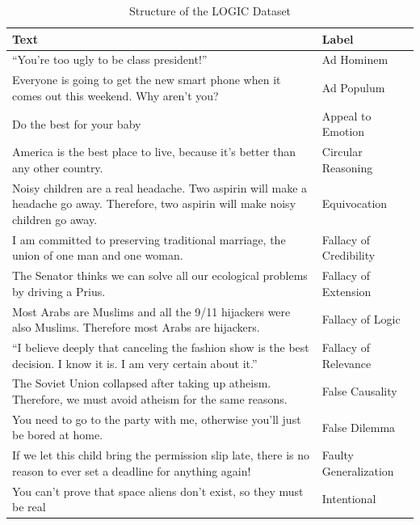 \documentclass[runningheads]{llncs}
\begin{document}
\begin{table}[h!]
    \centering
    \caption{Structure of the LOGIC Dataset}
    \label{tab:logicstructure}
    \begin{tabular}{|p{9.2cm}|p{3.1cm}|}
        \hline
        \textbf{Text} & \textbf{Label} \\
        \hline
        ``You're too ugly to be class president!'' & Ad Hominem \\
        Everyone is going to get the new smart phone when it comes out this weekend. Why aren't you? & Ad Populum \\
        Do the best for your baby & Appeal to Emotion \\
        America is the best place to live, because it's better than any other country. & Circular Reasoning \\
        Noisy children are a real headache. Two aspirin will make a headache go away. Therefore, two aspirin will make noisy children go away. & Equivocation \\
        I am committed to preserving traditional marriage, the union of one man and one woman. & Fallacy of Credibility \\
        The Senator thinks we can solve all our ecological problems by driving a Prius. & Fallacy of Extension \\
        Most Arabs are Muslims and all the 9/11 hijackers were also Muslims. Therefore most Arabs are hijackers. & Fallacy of Logic \\
        ``I believe deeply that canceling the fashion show is the best decision. I know it is. I am very certain about it.'' & Fallacy of Relevance \\
        The Soviet Union collapsed after taking up atheism. Therefore, we must avoid atheism for the same reasons. & False Causality \\
        You need to go to the party with me, otherwise you'll just be bored at home. & False Dilemma \\
        If we let this child bring the permission slip late, there is no reason to ever set a deadline for anything again! & Faulty Generalization \\
        You can't prove that space aliens don't exist, so they must be real & Intentional \\
        \hline
    \end{tabular}
\end{table}
\end{document}
